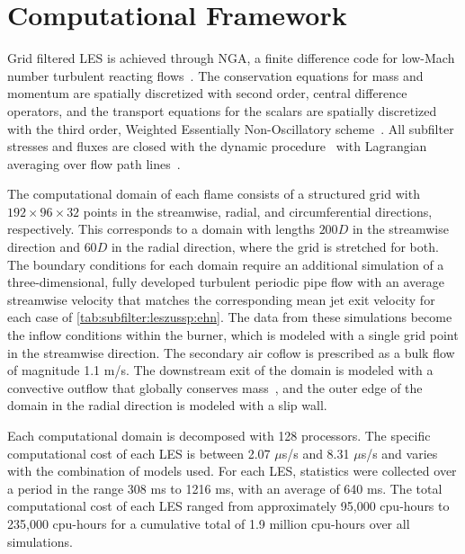 \section{Computational Framework}
\label{sec:lesresults:comput}

Grid filtered LES is achieved through NGA, a finite difference code for low-Mach number turbulent reacting flows~\cite{desjardins2008}. The conservation equations for mass and momentum are spatially discretized with second order, central difference operators, and the transport equations for the scalars are spatially discretized with the third order, Weighted Essentially Non-Oscillatory scheme~\cite{jiang1996}. All subfilter stresses and fluxes are closed with the dynamic procedure~\cite{germano1991,lilly1992,moin1991} with Lagrangian averaging over flow path lines~\cite{meneveau1996,reveillon1996}.

The computational domain of each flame consists of a structured grid with $192 \times 96 \times 32$ points in the streamwise, radial, and circumferential directions, respectively. This corresponds to a domain with lengths $200D$ in the streamwise direction and $60D$ in the radial direction, where the grid is stretched for both. The boundary conditions for each domain require an additional simulation of a three-dimensional, fully developed turbulent periodic pipe flow with an average streamwise velocity that matches the corresponding mean jet exit velocity for each case of \cref{tab:subfilter:leszussp:ehn}. The data from these simulations become the inflow conditions within the burner, which is modeled with a single grid point in the streamwise direction. The secondary air coflow is prescribed as a bulk flow of magnitude 1.1 m/s. The downstream exit of the domain is modeled with a convective outflow that globally conserves mass~\cite{akselvoll1996}, and the outer edge of the domain in the radial direction is modeled with a slip wall.

Each computational domain is decomposed with 128 processors. The specific computational cost of each LES is between 2.07 $\mu$s/s and 8.31 $\mu$s/s and varies with the combination of models used. For each LES, statistics were collected over a period in the range 308 ms to 1216 ms, with an average of 640 ms. The total computational cost of each LES ranged from approximately 95,000 cpu-hours to 235,000 cpu-hours for a cumulative total of 1.9 million cpu-hours over all simulations. %

